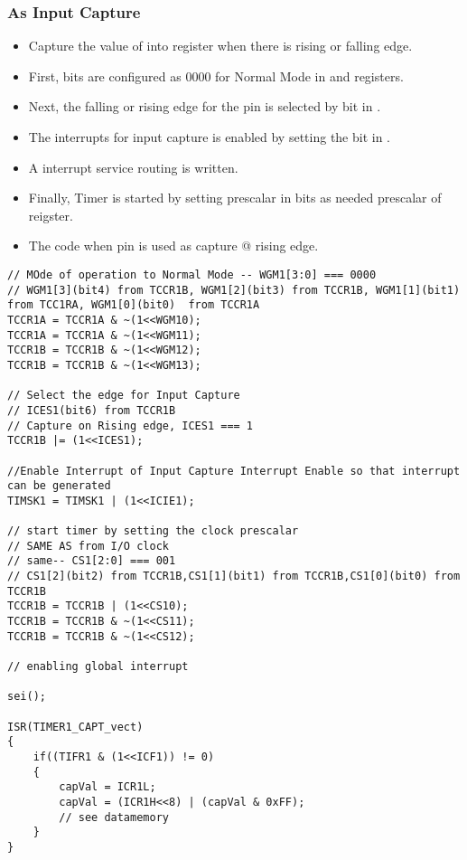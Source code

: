 \documentclass{article}
\begin{document}
\subsubsection{As Input Capture}
\begin{itemize}
    \item Capture the value of  into  register when there is rising or falling edge.
    \item First,  bits are configured as 0000 for Normal Mode in  and  registers.
    \item Next, the falling or rising edge for the  pin is selected by  bit in .
    \item The interrupts for input capture is enabled by setting the  bit in .
    \item A interrupt service routing is written.
    \item Finally, Timer is started by setting prescalar in  bits as needed prescalar of  reigster.
    \item The code when  pin is used as capture @ rising edge.
\end{itemize}
\begin{verbatim}
// MOde of operation to Normal Mode -- WGM1[3:0] === 0000
// WGM1[3](bit4) from TCCR1B, WGM1[2](bit3) from TCCR1B, WGM1[1](bit1)  from TCC1RA, WGM1[0](bit0)  from TCCR1A	
TCCR1A = TCCR1A & ~(1<<WGM10);
TCCR1A = TCCR1A & ~(1<<WGM11);
TCCR1B = TCCR1B & ~(1<<WGM12);
TCCR1B = TCCR1B & ~(1<<WGM13);

// Select the edge for Input Capture
// ICES1(bit6) from TCCR1B
// Capture on Rising edge, ICES1 === 1
TCCR1B |= (1<<ICES1);

//Enable Interrupt of Input Capture Interrupt Enable so that interrupt can be generated
TIMSK1 = TIMSK1 | (1<<ICIE1);
    
// start timer by setting the clock prescalar
// SAME AS from I/O clock
// same-- CS1[2:0] === 001
// CS1[2](bit2) from TCCR1B,CS1[1](bit1) from TCCR1B,CS1[0](bit0) from TCCR1B
TCCR1B = TCCR1B | (1<<CS10);
TCCR1B = TCCR1B & ~(1<<CS11);
TCCR1B = TCCR1B & ~(1<<CS12);

// enabling global interrupt

sei();

ISR(TIMER1_CAPT_vect)
{
	if((TIFR1 & (1<<ICF1)) != 0)
	{
		capVal = ICR1L;
		capVal = (ICR1H<<8) | (capVal & 0xFF);
		// see datamemory
	}
}
\end{verbatim}
\end{document}
